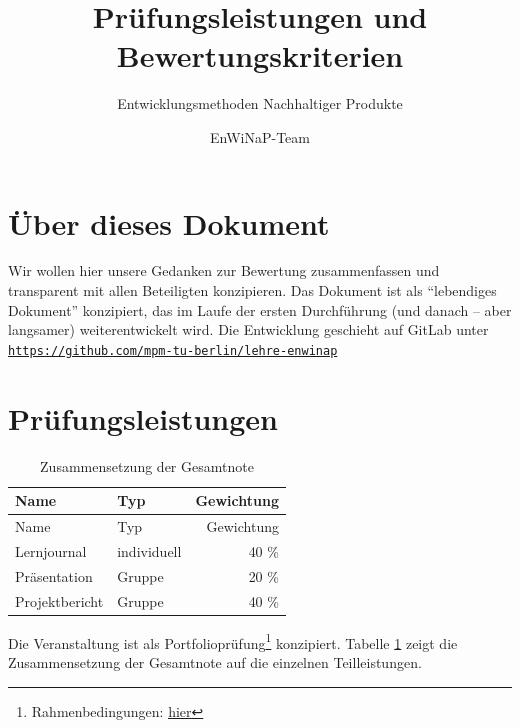 \documentclass[DIV=15,headinclude=true]{scrartcl}
\begin{document}
\title{Prüfungsleistungen und Bewertungskriterien}
\subtitle{Entwicklungsmethoden Nachhaltiger Produkte}
\author{EnWiNaP-Team}
\maketitle

\tableofcontents


\section{Über dieses Dokument}

Wir wollen hier unsere Gedanken zur Bewertung zusammenfassen und
transparent mit allen Beteiligten konzipieren. Das Dokument ist als
\enquote{lebendiges Dokument} konzipiert, das im Laufe der ersten
Durchführung (und danach -- aber langsamer) weiterentwickelt wird. Die
Entwicklung geschieht auf GitLab unter
\href{https://github.com/mpm-tu-berlin/lehre-enwinap}{\texttt{https://github.com/mpm-tu-berlin/lehre-enwinap}}

\section{Prüfungsleistungen}

\begin{table}\centering
	\label{tab:zusammensetzung}
	\caption{Zusammensetzung der Gesamtnote}
	\begin{tabular}{llr}
		\toprule
		Name           & Typ         & Gewichtung \\
		\midrule
		Name           & Typ         & Gewichtung \\
		Lernjournal    & individuell & 40 \%      \\
		Präsentation   & Gruppe      & 20 \%      \\
		Projektbericht & Gruppe      & 40 \%      \\
		\bottomrule
	\end{tabular}
\end{table}

Die Veranstaltung ist als Portfolioprüfung\footnote{Rahmenbedingungen:
	\href{https://www.tu-berlin.de/asv/menue/gremien/kommissionen_des_as/hinweise_zur_allgstupo/hinweise_zu_portfoliopruefungen/}{\underline{hier}}}
konzipiert. Tabelle \ref{tab:zusammensetzung} zeigt die
Zusammensetzung der Gesamtnote auf die einzelnen Teilleistungen.
\end{document}

